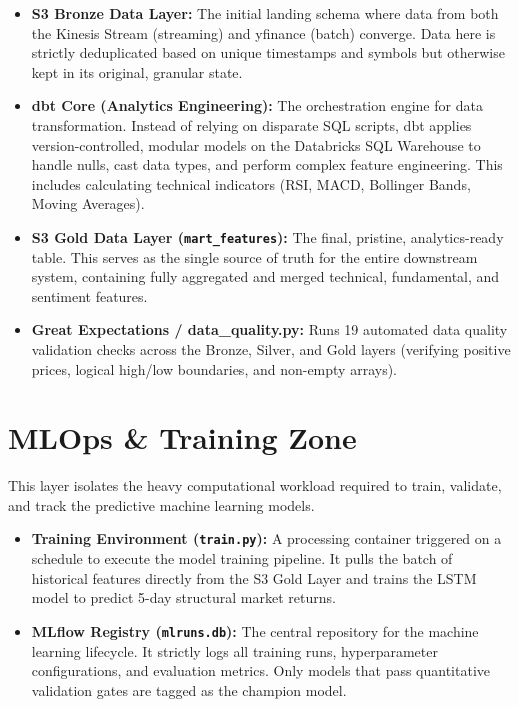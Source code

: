 \documentclass[11pt,a4paper]{article}
\begin{document}
\begin{itemize}[leftmargin=*]
    \item \textbf{S3 Bronze Data Layer:} The initial landing schema where data from both the Kinesis Stream (streaming) and yfinance (batch) converge. Data here is strictly deduplicated based on unique timestamps and symbols but otherwise kept in its original, granular state.
    \item \textbf{dbt Core (Analytics Engineering):} The orchestration engine for data transformation. Instead of relying on disparate SQL scripts, dbt applies version-controlled, modular models on the Databricks SQL Warehouse to handle nulls, cast data types, and perform complex feature engineering. This includes calculating technical indicators (RSI, MACD, Bollinger Bands, Moving Averages).
    \item \textbf{S3 Gold Data Layer (\texttt{mart\_features}):} The final, pristine, analytics-ready table. This serves as the single source of truth for the entire downstream system, containing fully aggregated and merged technical, fundamental, and sentiment features.
    \item \textbf{Great Expectations / data\_quality.py:} Runs 19 automated data quality validation checks across the Bronze, Silver, and Gold layers (verifying positive prices, logical high/low boundaries, and non-empty arrays).
\end{itemize}

\section{MLOps \& Training Zone}
This layer isolates the heavy computational workload required to train, validate, and track the predictive machine learning models.

\begin{itemize}[leftmargin=*]
    \item \textbf{Training Environment (\texttt{train.py}):} A processing container triggered on a schedule to execute the model training pipeline. It pulls the batch of historical features directly from the S3 Gold Layer and trains the LSTM model to predict 5-day structural market returns.
    \item \textbf{MLflow Registry (\texttt{mlruns.db}):} The central repository for the machine learning lifecycle. It strictly logs all training runs, hyperparameter configurations, and evaluation metrics. Only models that pass quantitative validation gates are tagged as the champion model.
\end{itemize}
\end{document}
